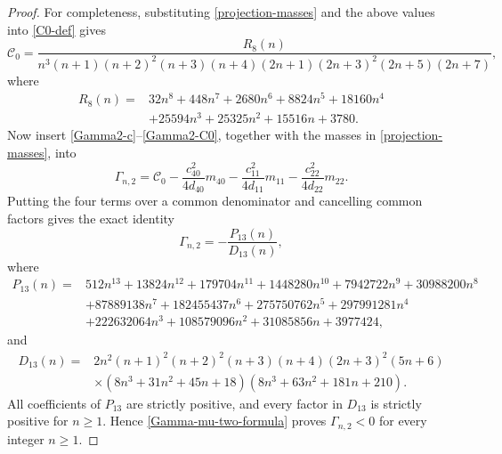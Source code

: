 \documentclass[10pt,a4paper]{amsart}
\begin{document}
\begin{proof}
For completeness, substituting \eqref{projection-masses} and the above values into \eqref{C0-def} gives
\begin{equation}\label{Gamma2-C0}
 \mathscr C_0=
 \frac{R_8(n)}
 {n^3(n+1)(n+2)^2(n+3)(n+4)(2n+1)(2n+3)^2(2n+5)(2n+7)},
\end{equation}
where
\begin{align*}
 R_8(n)={}&32n^8+448n^7+2680n^6+8824n^5+18160n^4\\
 &+25594n^3+25325n^2+15516n+3780.
\end{align*}
Now insert \eqref{Gamma2-c}--\eqref{Gamma2-C0}, together with the masses in \eqref{projection-masses}, into
\[
 \Gamma_{n,2}=\mathscr C_0-
 \frac{c_{40}^2}{4d_{40}}m_{40}
 -\frac{c_{11}^2}{4d_{11}}m_{11}
 -\frac{c_{22}^2}{4d_{22}}m_{22}.
\]
Putting the four terms over a common denominator and cancelling common factors gives the exact identity
\begin{equation}\label{Gamma-mu-two-formula}
 \Gamma_{n,2}=-\frac{P_{13}(n)}{D_{13}(n)},
\end{equation}
where
\begin{align*}
P_{13}(n)={}&512n^{13}+13824n^{12}+179704n^{11}+1448280n^{10}
 +7942722n^9+30988200n^8\\
&+87889138n^7+182455437n^6+275750762n^5+297991281n^4\\
&+222632064n^3+108579096n^2+31085856n+3977424,
\end{align*}
and
\begin{align*}
D_{13}(n)={}&2n^2(n+1)^2(n+2)^2(n+3)(n+4)(2n+3)^2(5n+6)\\
&\times(8n^3+31n^2+45n+18)(8n^3+63n^2+181n+210).
\end{align*}
All coefficients of $P_{13}$ are strictly positive, and every factor in $D_{13}$ is strictly positive for $n\ge1$. Hence \eqref{Gamma-mu-two-formula} proves $\Gamma_{n,2}<0$ for every integer $n\ge1$.
\end{proof}
\endgroup
\end{document}
